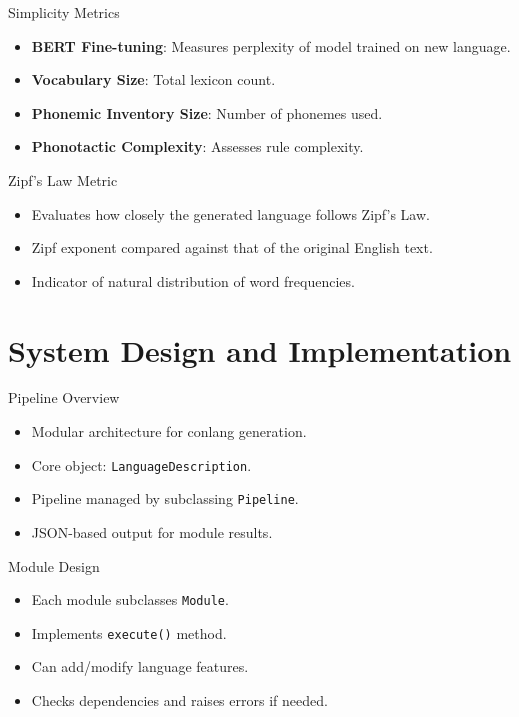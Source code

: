 \documentclass{beamer}
\begin{document}
\begin{frame}{Simplicity Metrics}
	\begin{itemize}
		\item \textbf{BERT Fine-tuning}: Measures perplexity of model trained on new language.
		\item \textbf{Vocabulary Size}: Total lexicon count.
		\item \textbf{Phonemic Inventory Size}: Number of phonemes used.
		\item \textbf{Phonotactic Complexity}: Assesses rule complexity.
	\end{itemize}
\end{frame}

\begin{frame}{Zipf's Law Metric}
	\begin{itemize}
		\item Evaluates how closely the generated language follows Zipf’s Law.
		\item Zipf exponent compared against that of the original English text.
		\item Indicator of natural distribution of word frequencies.
	\end{itemize}
\end{frame}

\section{System Design and Implementation}

\begin{frame}{Pipeline Overview}
	\begin{itemize}
		\item Modular architecture for conlang generation.
		\item Core object: \texttt{LanguageDescription}.
		\item Pipeline managed by subclassing \texttt{Pipeline}.
		\item JSON-based output for module results.
	\end{itemize}
\end{frame}

\begin{frame}{Module Design}
	\begin{itemize}
		\item Each module subclasses \texttt{Module}.
		\item Implements \texttt{execute()} method.
		\item Can add/modify language features.
		\item Checks dependencies and raises errors if needed.
	\end{itemize}
\end{frame}
\end{document}
